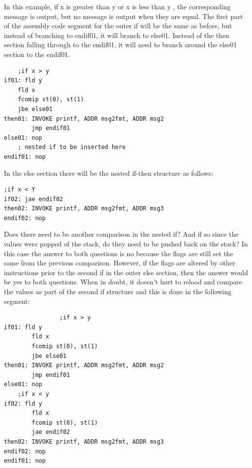 \documentclass[10pt]{book}
\begin{document}
\begin{center}
\begin{center}
\begin{center}
\begin{center}
In this example, if x is greater than y or x is less than y , the corresponding message is output, but no message is output when they are equal. The first part of the assembly code segment for the outer if will be the same as before, but instead of branching to endif01, it will branch to else01. Instead of the then section falling through to the endif01, it will need to branch around the else01 section to the endif01.

\begin{verbatim}
    ;if x > y
if01: fld y
    fld x
    fcomip st(0), st(1)
    jbe else01
then01: INVOKE printf, ADDR msg2fmt, ADDR msg2
        jmp endif01
else01: nop
    ; nested if to be inserted here
endif01: nop
\end{verbatim}

In the else section there will be the nested if-then structure as follows:

\begin{verbatim}
;if x < Y
if02: jae endif02
then02: INVOKE printf, ADDR msg2fmt, ADDR msg3
endif02: nop
\end{verbatim}

Does there need to be another comparison in the nested if? And if so since the values were popped of the stack, do they need to be pushed back on the stack? In this case the answer to both questions is no because the flags are still set the same from the previous comparison. However, if the flags are altered by other instructions prior to the second if in the outer else section, then the answer would be yes to both questions. When in doubt, it doesn't hurt to reload and compare the values as part of the second if structure and this is done in the following segment:

\begin{verbatim}
                ;if x > y
if01: fld y
        fld x
        fcomip st(0), st(1)
        jbe else01
then01: INVOKE printf, ADDR msg2fmt, ADDR msg2
        jmp endif01
else01: nop
    ;if x < y
if02: fld y
        fld x
        fcomip st(0), st(1)
        jae endif02
then02: INVOKE printf, ADDR msg2fmt, ADDR msg3
endif02: nop
endif01: nop
\end{verbatim}


\end{center}
\end{center}
\end{center}
\end{center}
\end{document}
